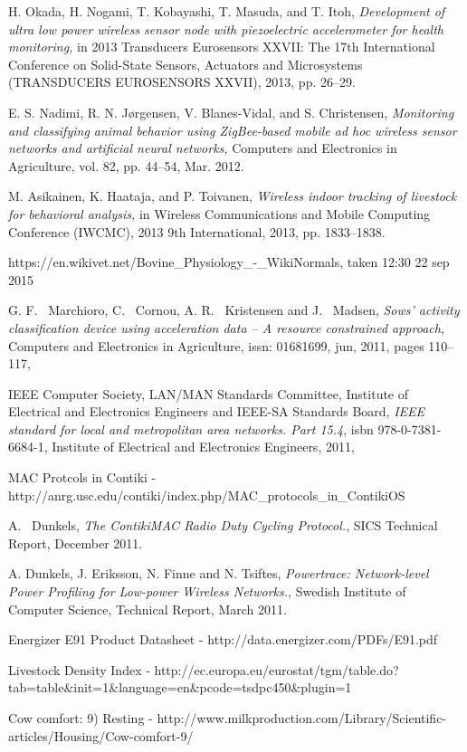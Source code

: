 \documentclass[conference]{IEEEtran}
\begin{document}
\begin{thebibliography}{1}
H. Okada, H. Nogami, T. Kobayashi, T. Masuda, and T. Itoh, \emph{Development of ultra low power wireless sensor node with piezoelectric accelerometer for health monitoring,} in 2013 Transducers Eurosensors XXVII: The 17th International Conference on Solid-State Sensors, Actuators and Microsystems (TRANSDUCERS EUROSENSORS XXVII), 2013, pp. 26–29.

E. S. Nadimi, R. N. Jørgensen, V. Blanes-Vidal, and S. Christensen, \emph{Monitoring and classifying animal behavior using ZigBee-based mobile ad hoc wireless sensor networks and artificial neural networks,} Computers and Electronics in Agriculture, vol. 82, pp. 44–54, Mar. 2012.

M. Asikainen, K. Haataja, and P. Toivanen, \emph{Wireless indoor tracking of livestock for behavioral analysis,} in Wireless Communications and Mobile Computing Conference (IWCMC), 2013 9th International, 2013, pp. 1833–1838.

https://en.wikivet.net/Bovine\_Physiology\_-\_WikiNormals, taken 12:30 22 sep
2015 

G. F. ~Marchioro, C. ~Cornou, A. R. ~Kristensen and J. ~Madsen,
\emph{Sows’ activity classification device using acceleration data – A resource constrained approach},
Computers and Electronics in Agriculture,
issn: 01681699,
jun,
2011,
pages 110--117,

IEEE Computer Society, LAN/MAN Standards Committee, Institute of Electrical
and Electronics Engineers and IEEE-SA Standards Board, \emph{IEEE standard
for local and metropolitan area networks. Part 15.4}, isbn
978-0-7381-6684-1, Institute of Electrical and Electronics Engineers, 2011,

	MAC Protcols in Contiki - http://anrg.usc.edu/contiki/index.php/MAC\_protocols\_in\_ContikiOS

	A. ~Dunkels, \emph{The ContikiMAC Radio Duty Cycling Protocol.}, SICS Technical Report, December 2011.

    A. Dunkels, J. Eriksson, N. Finne and N. Tsiftes, \emph{Powertrace: Network-level Power 
    Profiling for Low-power Wireless Networks.}, Swedish Institute of Computer Science, 
    Technical Report, March 2011.
    
	Energizer E91 Product Datasheet - http://data.energizer.com/PDFs/E91.pdf

    Livestock Density Index
    - http://ec.europa.eu/eurostat/tgm/table.do?tab=table\&init=1\&language=en\&pcode=tsdpc450\&plugin=1
    
    Cow comfort: 9) Resting -
    http://www.milkproduction.com/Library/Scientific-articles/Housing/Cow-comfort-9/


\end{thebibliography}


\end{document}
